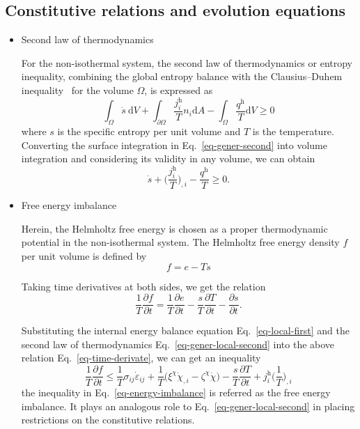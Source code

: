 \documentclass[reprint,3p,sort&compress,times,onecolumn]{elsarticle}
\begin{document}
\subsection{Constitutive relations and evolution equations} 
\begin{itemize}

\item Second law of thermodynamics

For the non-isothermal system, the second law of thermodynamics or entropy inequality, combining the global entropy balance with the Clausius--Duhem inequality~\cite{gurtin1966clausius} for the volume $\Omega$, is expressed as
\begin{equation}
\int_\Omega \dot{s} ~\text{d}V +\int_{\partial\Omega} \frac{j_i^{\text{h}}}{T}n_i \text{d}A- \int_\Omega \frac{q^{\text{h}}}{T} \text{d}V \geq 0 \label{eq-gener-second}
\end{equation}
where $s$ is the specific entropy per unit volume and $T$ is the temperature. Converting the surface integration in Eq.~\ref{eq-gener-second} into volume integration and considering its validity in any volume, we can obtain
\begin{equation}
\dot{s} +\Big(\frac{j_i^{\text{h}}}{T}\Big)_{,i}-\frac{q^{\text{h}}}{T} \geq 0 . \label{eq-gener-local-second}
\end{equation}


\item Free energy imbalance

Herein, the Helmholtz free energy is chosen as a proper thermodynamic potential in the non-isothermal system.
The Helmholtz free energy density $f$ per unit volume is defined by 
\begin{equation}
f=e-Ts \label{eq-f-e}
\end{equation}

Taking time derivatives at both sides, we get the relation
\begin{equation}
\frac{1}{T}\frac{\partial f}{\partial t}=\frac{1}{T}\frac{\partial e}{\partial t}-\frac{s}{T}\frac{\partial T}{\partial t}-\frac{\partial s}{\partial t}. \label{eq-time-derivate}
\end{equation}

Substituting the internal energy balance equation Eq.~\ref{eq-local-first} and the second law of thermodynamics Eq.~\ref{eq-gener-local-second} into the above relation Eq.~\ref{eq-time-derivate}, we can get an inequality
\begin{equation}
\frac{1}{T}\frac{\partial f}{\partial t} \leq \frac{1}{T}\sigma_{ij}\dot{\varepsilon}_{ij}+\frac{1}{T}\Big( \xi^{\chi}\dot{\chi}_{,i}-\zeta^{\chi}\dot{\chi} \Big)-\frac{s}{T}\frac{\partial T}{\partial t} + j_i^{\text{h}}\Big(\frac{1}{T}\Big)_{,i} \label{eq-energy-imbalance}
\end{equation}
the inequality in Eq.~\ref{eq-energy-imbalance} is referred as the free energy imbalance. It plays an analogous role to Eq.~\ref{eq-gener-local-second} in placing restrictions on the constitutive relations. 




\end{itemize}
\end{document}
